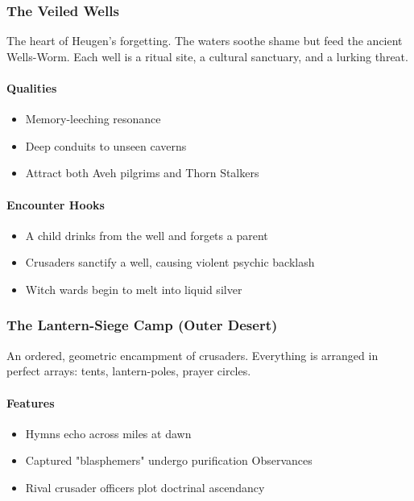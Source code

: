 \documentclass[11pt]{book}
\begin{document}
\subsubsection*{The Veiled Wells}

The heart of Heugen's forgetting. The waters soothe shame but feed the ancient
Wells-Worm. Each well is a ritual site, a cultural sanctuary, and a lurking threat.

\paragraph{Qualities}
\begin{itemize}[leftmargin=*]
    \item Memory-leeching resonance
    \item Deep conduits to unseen caverns
    \item Attract both Aveh pilgrims and Thorn Stalkers
\end{itemize}

\paragraph{Encounter Hooks}
\begin{itemize}[leftmargin=*]
    \item A child drinks from the well and forgets a parent  
    \item Crusaders sanctify a well, causing violent psychic backlash  
    \item Witch wards begin to melt into liquid silver
\end{itemize}

\subsubsection*{The Lantern-Siege Camp (Outer Desert)}

An ordered, geometric encampment of crusaders.  
Everything is arranged in perfect arrays: tents, lantern-poles, prayer circles.

\paragraph{Features}
\begin{itemize}[leftmargin=*]
    \item Hymns echo across miles at dawn  
    \item Captured "blasphemers" undergo purification Observances  
    \item Rival crusader officers plot doctrinal ascendancy
\end{itemize}
\end{document}
